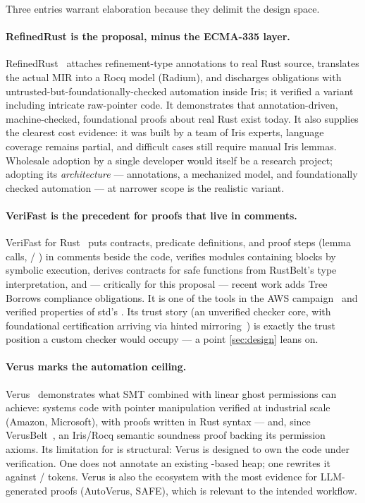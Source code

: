 Three entries warrant elaboration because they delimit the design
space.

\paragraph{RefinedRust is the proposal, minus the ECMA-335 layer.}
RefinedRust~\cite{refinedrust2024} attaches refinement-type annotations to
real Rust source, translates the actual MIR into a Rocq model (Radium),
and discharges obligations with untrusted-but-foundationally-checked
automation inside Iris; it verified a  variant including
intricate raw-pointer code. It demonstrates that annotation-driven,
machine-checked, foundational proofs about real  Rust
exist today. It also supplies the clearest cost evidence: it was built
by a team of Iris experts, language coverage remains partial, and
difficult cases still require manual Iris lemmas. Wholesale adoption
by a single developer would itself be a research project; adopting its
\emph{architecture} --- annotations, a mechanized model, and
foundationally checked automation --- at narrower scope is the
realistic variant.

\paragraph{VeriFast is the precedent for proofs that live in comments.}
VeriFast for Rust~\cite{verifastrust2022,verifasttb2026} puts contracts,
predicate definitions, and proof steps (lemma calls, /%
) in  comments beside the code, verifies
modules containing  blocks by symbolic execution, derives
contracts for safe functions from RustBelt's type interpretation, and ---
critically for this proposal --- recent work adds Tree Borrows
compliance obligations.
It is one of the tools in the AWS 
campaign~\cite{verifyruststd2025} and verified properties of std's
. Its trust story (an unverified checker core, with
foundational certification arriving via hinted
mirroring~\cite{foundationalverifast2026}) is exactly the trust position a
custom \safetyc{} checker would occupy --- a point \cref{sec:design} leans
on.

\paragraph{Verus marks the automation ceiling.}
Verus~\cite{verus2024,verusghost2023} demonstrates what SMT combined
with linear ghost permissions can achieve: systems code with pointer
manipulation verified at industrial scale (Amazon, Microsoft), with
proofs written in Rust syntax --- and, since
VerusBelt~\cite{verusbelt2026}, an Iris/Rocq semantic soundness proof
backing its permission axioms. Its limitation for \dotnetrs{} is
structural: Verus is designed to own the code under verification. One
does not annotate an existing \gcarena{}-based heap; one rewrites it
against / tokens. Verus is also the ecosystem
with the most evidence for LLM-generated proofs (AutoVerus, SAFE),
which is relevant to the intended workflow.

